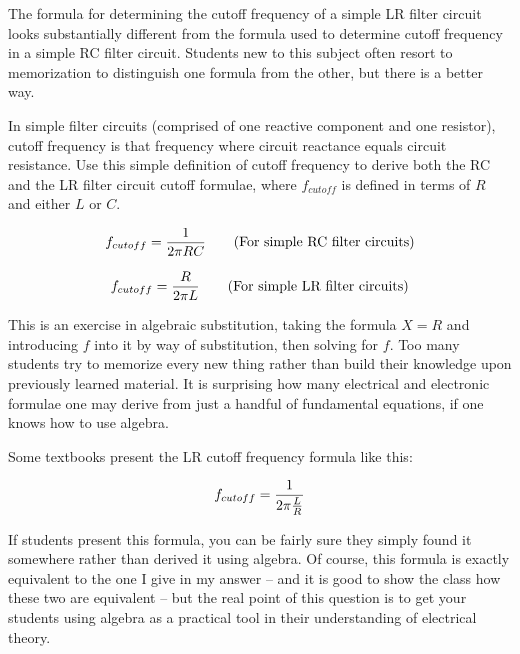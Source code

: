 

The formula for determining the cutoff frequency of a simple LR filter circuit looks substantially different from the formula used to determine cutoff frequency in a simple RC filter circuit.  Students new to this subject often resort to memorization to distinguish one formula from the other, but there is a better way.

In simple filter circuits (comprised of one reactive component and one resistor), cutoff frequency is that frequency where circuit reactance equals circuit resistance.  Use this simple definition of cutoff frequency to derive both the RC and the LR filter circuit cutoff formulae, where $f_{cutoff}$ is defined in terms of $R$ and either $L$ or $C$.







$$f_{cutoff} = {1 \over {2 \pi R C}} \hbox{\hskip 20pt (For simple RC filter circuits)}$$

$$f_{cutoff} = {R \over {2 \pi L}} \hbox{\hskip 20pt (For simple LR filter circuits)}$$







This is an exercise in algebraic substitution, taking the formula $X = R$ and introducing $f$ into it by way of substitution, then solving for $f$.  Too many students try to memorize every new thing rather than build their knowledge upon previously learned material.  It is surprising how many electrical and electronic formulae one may derive from just a handful of fundamental equations, if one knows how to use algebra.

Some textbooks present the LR cutoff frequency formula like this:

$$f_{cutoff} = {1 \over {2 \pi {L \over R}}}$$

If students present this formula, you can be fairly sure they simply found it somewhere rather than derived it using algebra.  Of course, this formula is exactly equivalent to the one I give in my answer -- and it is good to show the class how these two are equivalent -- but the real point of this question is to get your students using algebra as a practical tool in their understanding of electrical theory.





